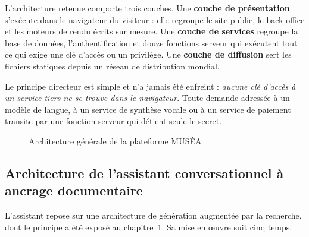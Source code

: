 L'architecture retenue comporte trois couches. Une \textbf{couche de
présentation} s'exécute dans le navigateur du visiteur : elle regroupe le site
public, le back-office et les moteurs de rendu écrits sur mesure. Une
\textbf{couche de services} regroupe la base de données, l'authentification et
douze fonctions serveur qui exécutent tout ce qui exige une clé d'accès ou un
privilège. Une \textbf{couche de diffusion} sert les fichiers statiques depuis
un réseau de distribution mondial.

Le principe directeur est simple et n'a jamais été enfreint : \emph{aucune clé
d'accès à un service tiers ne se trouve dans le navigateur}. Toute demande
adressée à un modèle de langue, à un service de synthèse vocale ou à un service
de paiement transite par une fonction serveur qui détient seule le secret.

\begin{figure}[htbp]
\centering
{}
\caption{Architecture générale de la plateforme MUSÉA}
\label{fig:archi}
\end{figure}

\subsection{Architecture de l'assistant conversationnel à ancrage documentaire}

L'assistant repose sur une architecture de génération augmentée par la
recherche, dont le principe a été exposé au chapitre~1. Sa mise en œuvre suit
cinq temps.

